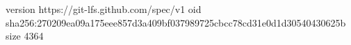 version https://git-lfs.github.com/spec/v1
oid sha256:270209ea09a175eee857d3a409bf037989725cbcc78cd31e0d1d30540430625b
size 4364
